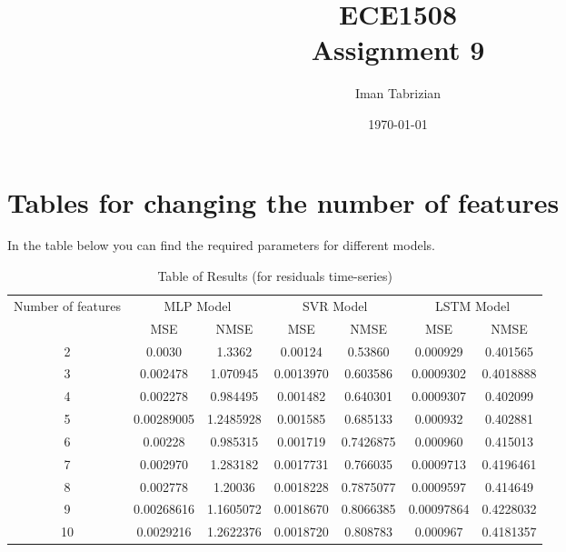 \documentclass{article}
\title{ECE1508 \\Assignment 9}
\author{Iman Tabrizian}
\date{\today}
\begin{document}
\maketitle

\section{Tables for changing the number of features}

In the table below you can find the required parameters for different models.

\begin{table}[htb!]
	\begin{tabular}{ccccccc}
		\toprule
		\multirow{2}{*}{Number of features} & \multicolumn{2}{c}{MLP Model} & \multicolumn{2}{c}{SVR Model} & \multicolumn{2}{c}{LSTM Model} \\ 
		\cmidrule {2-7}
		 & MSE & NMSE & MSE & NMSE & MSE & NMSE  \\
		\midrule
		2 & 0.0030 & 1.3362 & 0.00124 & 0.53860 & 0.000929 & 0.401565 \\
		\midrule
		3 & 0.002478 & 1.070945 & 0.0013970 & 0.603586 &  0.0009302 &  0.4018888 \\
		\midrule
		4 & 0.002278 & 0.984495 & 0.001482 & 0.640301 & 0.0009307 & 0.402099 \\
		\midrule
		5 & 0.00289005 & 1.2485928 & 0.001585 & 0.685133 & 0.000932 & 0.402881 \\
		\midrule
		6 & 0.00228 & 0.985315 & 0.001719 & 0.7426875 & 0.000960 & 0.415013 \\
		\midrule
		7 & 0.002970 & 1.283182 & 0.0017731 & 0.766035 & 0.0009713 & 0.4196461 \\
		\midrule
		8 & 0.002778 & 1.20036 & 0.0018228 & 0.7875077 & 0.0009597 & 0.414649 \\
		\midrule
		9 & 0.00268616 & 1.1605072 & 0.0018670 & 0.8066385 & 0.00097864 & 0.4228032 \\
		\midrule
		10 & 0.0029216 & 1.2622376 & 0.0018720 & 0.808783 & 0.000967 & 0.4181357  \\
		\bottomrule
	\end{tabular}
	\caption{Table of Results (for residuals time-series)}
\end{table}
\end{document}

